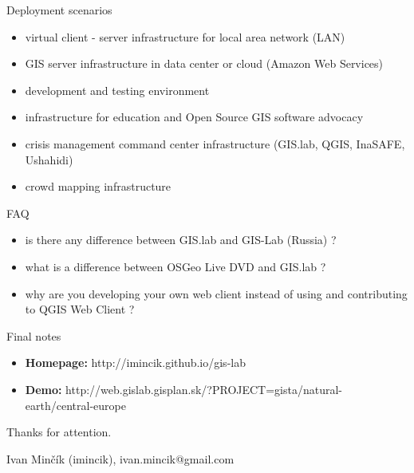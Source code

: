 \documentclass[12pt]{beamer}
\begin{document}
\begin{frame}{Deployment scenarios}
	\begin{itemize}
		\item virtual client - server infrastructure for local area network (LAN)
		\item GIS server infrastructure in data center or cloud (Amazon Web Services)
		\item development and testing environment
		\item infrastructure for education and Open Source GIS software advocacy
		\item crisis management command center infrastructure (GIS.lab, QGIS, InaSAFE, Ushahidi)
		\item crowd mapping infrastructure
	\end{itemize}
\end{frame}


\begin{frame}{FAQ}
	\begin{itemize}
		\item is there any difference between GIS.lab and GIS-Lab (Russia) ?
		\item what is a difference between OSGeo Live DVD and GIS.lab ?
		\item why are you developing your own web client instead of using and contributing to QGIS Web Client ?
	\end{itemize}
\end{frame}


\begin{frame}{Final notes}
	\begin{itemize}
		\item \textbf{Homepage:} http://imincik.github.io/gis-lab
		\item \textbf{Demo:} http://web.gislab.gisplan.sk/?PROJECT=gista/natural-earth/central-europe
	\end{itemize}
	
	\bigskip
	Thanks for attention.
	
	Ivan Minčík (imincik), ivan.mincik@gmail.com
\end{frame}


\end{document}
